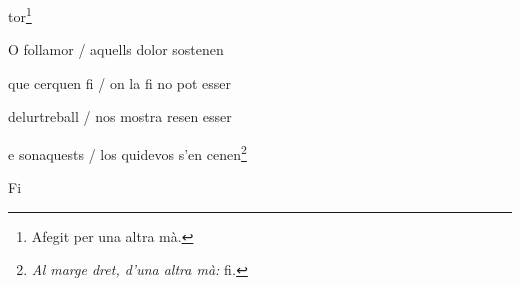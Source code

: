 \documentclass[12pt]{article}
\begin{document}
\begin{estrofaExtra}%




\begin{tornada}

tor\footnote{Afegit per una altra m\`{a}.}

\end{tornada}


\end{estrofaExtra}


\begin{estrofa}

 O follamor / aquells dolor sostenen

 que cerquen fi / on la fi no pot esser

 delurtreball / nos mostra resen esser

 e sonaquests / los quidevos s'en cenen\footnote{\textit{Al marge dret, d'una
altra m\`{a}: }fi\textit{.}}

\end{estrofa}



\begin{estrofaExtra}%

\begin{final}

Fi

\end{final}

\end{estrofaExtra}
\end{document}
